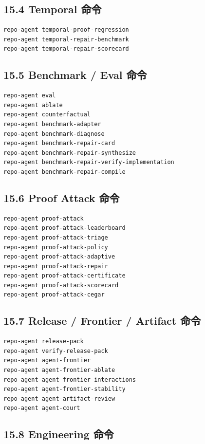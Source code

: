 \documentclass[UTF8,12pt,openany]{ctexbook}
\begin{document}
\subsection{15.4 Temporal 命令}

\begin{lstlisting}
repo-agent temporal-proof-regression
repo-agent temporal-repair-benchmark
repo-agent temporal-repair-scorecard
\end{lstlisting}

\subsection{15.5 Benchmark / Eval 命令}

\begin{lstlisting}
repo-agent eval
repo-agent ablate
repo-agent counterfactual
repo-agent benchmark-adapter
repo-agent benchmark-diagnose
repo-agent benchmark-repair-card
repo-agent benchmark-repair-synthesize
repo-agent benchmark-repair-verify-implementation
repo-agent benchmark-repair-compile
\end{lstlisting}

\subsection{15.6 Proof Attack 命令}

\begin{lstlisting}
repo-agent proof-attack
repo-agent proof-attack-leaderboard
repo-agent proof-attack-triage
repo-agent proof-attack-policy
repo-agent proof-attack-adaptive
repo-agent proof-attack-repair
repo-agent proof-attack-certificate
repo-agent proof-attack-scorecard
repo-agent proof-attack-cegar
\end{lstlisting}

\subsection{15.7 Release / Frontier / Artifact 命令}

\begin{lstlisting}
repo-agent release-pack
repo-agent verify-release-pack
repo-agent agent-frontier
repo-agent agent-frontier-ablate
repo-agent agent-frontier-interactions
repo-agent agent-frontier-stability
repo-agent agent-artifact-review
repo-agent agent-court
\end{lstlisting}

\subsection{15.8 Engineering 命令}
\end{document}
